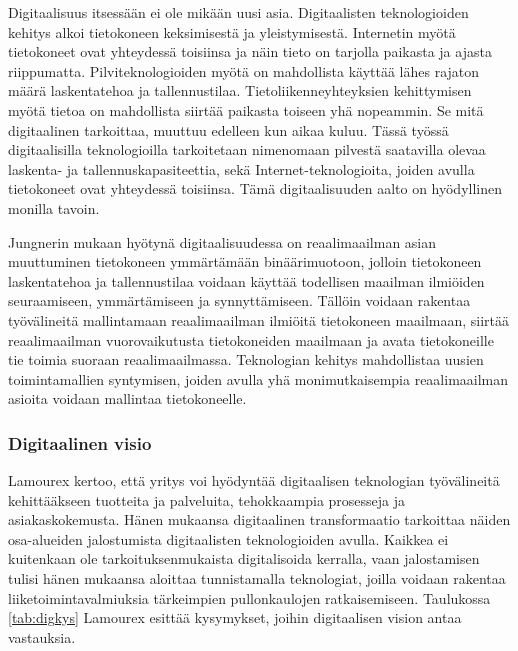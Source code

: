 \documentclass[finnish,12pt,a4paper,pdftex]{article}
\begin{document}
Digitaalisuus itsessään ei ole mikään uusi asia. Digitaalisten teknologioiden kehitys alkoi tietokoneen keksimisestä ja yleistymisestä. Internetin myötä tietokoneet ovat yhteydessä toisiinsa ja näin tieto on tarjolla paikasta ja ajasta riippumatta. Pilviteknologioiden myötä on mahdollista käyttää lähes rajaton määrä laskentatehoa ja tallennustilaa. Tietoliikenneyhteyksien kehittymisen myötä tietoa on mahdollista siirtää paikasta toiseen yhä nopeammin. Se mitä digitaalinen tarkoittaa, muuttuu edelleen kun aikaa kuluu. Tässä työssä digitaalisilla teknologioilla tarkoitetaan nimenomaan pilvestä saatavilla olevaa laskenta- ja tallennuskapasiteettia, sekä Internet-teknologioita, joiden avulla tietokoneet ovat yhteydessä toisiinsa. Tämä digitaalisuuden aalto on hyödyllinen monilla tavoin. 

Jungnerin \citeyearpar{jungner} mukaan hyötynä digitaalisuudessa on reaalimaailman asian muuttuminen tietokoneen ymmärtämään binäärimuotoon, jolloin tietokoneen laskentatehoa ja tallennustilaa voidaan käyttää todellisen maailman ilmiöiden seuraamiseen, ymmärtämiseen ja synnyttämiseen. Tällöin voidaan rakentaa työvälineitä mallintamaan reaalimaailman ilmiöitä tietokoneen maailmaan, siirtää reaalimaailman vuorovaikutusta tietokoneiden maailmaan ja avata tietokoneille tie toimia suoraan reaalimaailmassa. Teknologian kehitys mahdollistaa uusien toimintamallien syntymisen, joiden avulla yhä monimutkaisempia reaalimaailman asioita voidaan mallintaa tietokoneelle.

\subsubsection{Digitaalinen visio}

Lamourex \citeyearpar{lamoureux} kertoo, että yritys voi hyödyntää digitaalisen teknologian työvälineitä kehittääkseen tuotteita ja palveluita, tehokkaampia prosesseja ja asiakaskokemusta. Hänen mukaansa digitaalinen transformaatio tarkoittaa näiden osa-alueiden jalostumista digitaalisten teknologioiden avulla. Kaikkea ei kuitenkaan ole tarkoituksenmukaista digitalisoida kerralla, vaan jalostamisen tulisi hänen mukaansa aloittaa tunnistamalla teknologiat, joilla voidaan rakentaa liiketoimintavalmiuksia tärkeimpien pullonkaulojen ratkaisemiseen. Taulukossa \ref{tab:digkys} Lamourex esittää kysymykset, joihin digitaalisen vision antaa vastauksia.
\end{document}
